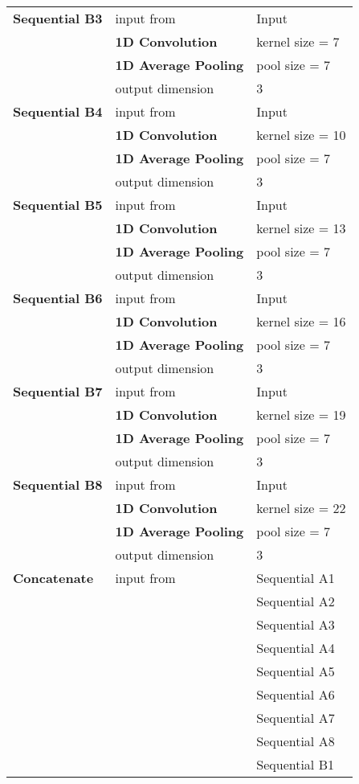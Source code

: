 \begin{tabularx}{\textwidth}[!h]{X X X}
	\textbf{Sequential B3} & input from & Input\\
	& \textbf{1D Convolution} & kernel size = 7\\
	& \textbf{1D Average Pooling} & pool size = 7\\
	& output dimension & 3\\
	[8pt]
	\textbf{Sequential B4} & input from & Input\\
	& \textbf{1D Convolution} & kernel size = 10\\
	& \textbf{1D Average Pooling} & pool size = 7\\
	& output dimension & 3\\
	[8pt]
	\textbf{Sequential B5} & input from & Input\\
	& \textbf{1D Convolution} & kernel size = 13\\
	& \textbf{1D Average Pooling} & pool size = 7\\
	& output dimension & 3\\
	[8pt]
	\textbf{Sequential B6} & input from & Input\\
	& \textbf{1D Convolution} & kernel size = 16\\
	& \textbf{1D Average Pooling} & pool size = 7\\
	& output dimension & 3\\
	[8pt]
	\textbf{Sequential B7} & input from & Input\\
	& \textbf{1D Convolution} & kernel size = 19\\
	& \textbf{1D Average Pooling} & pool size = 7\\
	& output dimension & 3\\
	[8pt]
	\textbf{Sequential B8} & input from & Input\\
	& \textbf{1D Convolution} & kernel size = 22\\
	& \textbf{1D Average Pooling} & pool size = 7\\
	& output dimension & 3\\
	[8pt]
	\textbf{Concatenate} & input from & Sequential A1\\
	& & Sequential A2\\
	& & Sequential A3\\
	& & Sequential A4\\
	& & Sequential A5\\
	& & Sequential A6\\
	& & Sequential A7\\
	& & Sequential A8\\
	& & Sequential B1\\

\end{tabularx}

